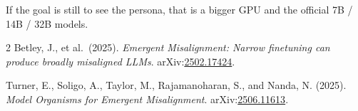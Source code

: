 \documentclass[11pt]{article}
\begin{document}
If the goal is still to see the persona, that is a bigger GPU and the
official 7B / 14B / 32B models.

\begin{thebibliography}{2}
  Betley, J., et al.\ (2025).
  \textit{Emergent Misalignment: Narrow finetuning can produce
  broadly misaligned LLMs}.
  arXiv:\href{https://arxiv.org/abs/2502.17424}{2502.17424}.

  Turner, E., Soligo, A., Taylor, M., Rajamanoharan, S., and Nanda, N.
  (2025).
  \textit{Model Organisms for Emergent Misalignment}.
  arXiv:\href{https://arxiv.org/abs/2506.11613}{2506.11613}.
\end{thebibliography}
\end{document}
